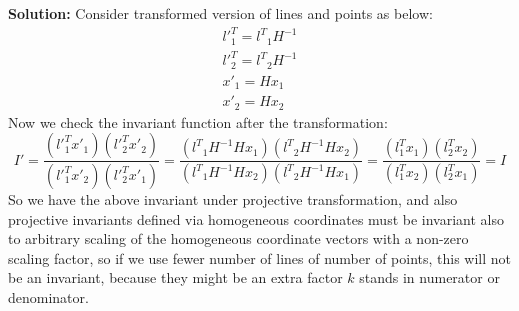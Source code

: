 \documentclass[12pt]{article}
\begin{document}
\begin{enumerate}[leftmargin=\labelsep]
\begin{enumerate}
\textbf{Solution:} Consider transformed version of lines and points as below:
        \begin{gather}
              l'^T_1 = {l^T}_1 H^{-1}\\
              l'^T_2 = {l^T}_2 H^{-1}\\
              x'_1 = Hx_1\\
              x'_2 = Hx_2
        \end{gather}
        Now we check the invariant function after the transformation:
        \begin{equation}
            I' = \frac{(l'^T_1x'_1)(l'^T_2x'_2)}{(l'^T_1x'_2)(l'^T_2x'_1)} = \frac{({l^T}_1 H^{-1}Hx_1)({l^T}_2 H^{-1}Hx_2)}{({l^T}_1 H^{-1}Hx_2)({l^T}_2 H^{-1}Hx_1)} = \frac{(l^T_1x_1)(l^T_2x_2)}{(l^T_1x_2)(l^T_2x_1)} = I
        \end{equation}
        So we have the above invariant under projective transformation, and also projective invariants defined via homogeneous coordinates must be invariant also to arbitrary scaling of the homogeneous coordinate vectors with a non-zero scaling factor, so if we use fewer number of lines of number of points, this will not be an invariant, because they might be an extra factor $k$ stands in numerator or denominator.
     \end{enumerate}
\end{enumerate}
\end{document}

